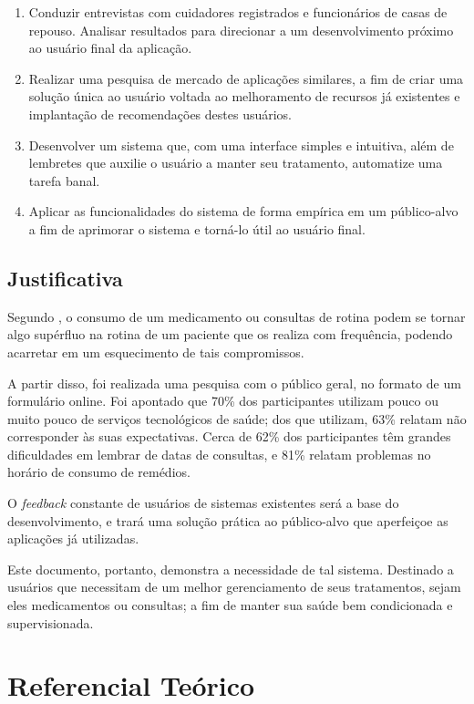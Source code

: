 \documentclass[
	article,			%
	12pt,				%
	oneside,			%
	a4paper,			%
    BIBLATEX,           %
	english,			%
	brazil,				%
	sumario=tradicional
	]{abntex2}
\begin{document}
\begin{enumerate}
    \item Conduzir entrevistas com cuidadores registrados e funcionários de casas de repouso. Analisar resultados para direcionar a um desenvolvimento próximo ao usuário final da aplicação.
    \item Realizar uma pesquisa de mercado de aplicações similares, a fim de criar uma solução única ao usuário voltada ao melhoramento de recursos já existentes e implantação de recomendações destes usuários. 
    \item Desenvolver um sistema que, com uma interface simples e intuitiva, além de lembretes que auxilie o usuário a manter seu tratamento, automatize uma tarefa banal.
    \item Aplicar as funcionalidades do sistema de forma empírica em um público-alvo a fim de aprimorar o sistema e torná-lo útil ao usuário final.
\end{enumerate}


\subsection{Justificativa}    

Segundo , o consumo de um medicamento ou consultas de rotina podem se tornar algo supérfluo na rotina de um paciente que os realiza com frequência, podendo acarretar em um esquecimento de tais compromissos. 

A partir disso, foi realizada uma pesquisa com o público geral, no formato de um formulário online. Foi apontado que 70\% dos participantes utilizam pouco ou muito pouco de serviços tecnológicos de saúde; dos que utilizam, 63\% relatam não corresponder às suas expectativas. Cerca de 62\% dos participantes têm grandes dificuldades em lembrar de datas de consultas, e 81\% relatam problemas no horário de consumo de remédios.

O \textit{feedback} constante de usuários de sistemas existentes será a base do desenvolvimento, e trará uma solução prática ao público-alvo que aperfeiçoe as aplicações já utilizadas.

Este documento, portanto, demonstra a necessidade de tal sistema. Destinado a usuários que necessitam de um melhor gerenciamento de seus tratamentos, sejam eles medicamentos ou consultas; a fim de manter sua saúde bem condicionada e supervisionada.

\section{Referencial Teórico}
\end{document}
